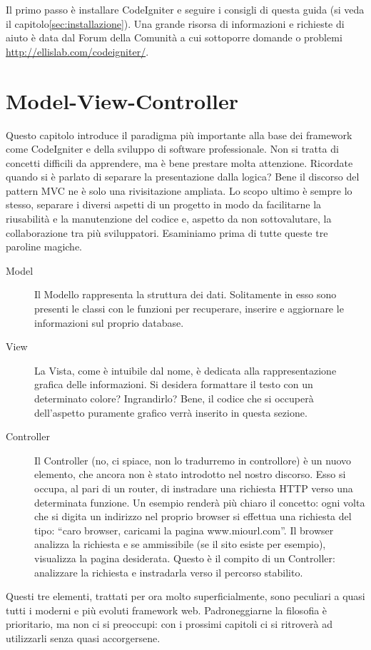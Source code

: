 Il primo passo è installare CodeIgniter e seguire i consigli di questa guida (si veda il capitolo\vref{sec:installazione}). Una grande risorsa di informazioni e richieste di aiuto è data dal Forum della Comunità a cui sottoporre domande o problemi \url{http://ellislab.com/codeigniter/}.

\section{Model-View-Controller}
Questo capitolo introduce il paradigma più importante alla base dei framework come CodeIgniter e della sviluppo di software professionale. Non si tratta di concetti difficili da apprendere, ma è bene prestare molta attenzione. Ricordate quando si è parlato di separare la presentazione dalla logica? Bene il discorso del pattern \ac{MVC} ne è solo una rivisitazione ampliata. Lo scopo ultimo è sempre lo stesso, separare i diversi aspetti di un progetto in modo da facilitarne la riusabilità e la manutenzione del codice e, aspetto da non sottovalutare, la collaborazione tra più sviluppatori. Esaminiamo prima di tutte queste tre paroline magiche.

\begin{description}
\item [Model] Il Modello rappresenta la struttura dei dati. Solitamente in esso sono presenti le classi con le funzioni per recuperare, inserire e aggiornare le informazioni sul proprio database.
\item [View] La Vista, come è intuibile dal nome, è dedicata alla rappresentazione grafica delle informazioni. Si desidera formattare il testo con un determinato colore? Ingrandirlo? Bene, il codice che si occuperà dell'aspetto puramente grafico verrà inserito in questa sezione.
\item [Controller] Il Controller (no, ci spiace, non lo tradurremo in controllore) è un nuovo elemento, che ancora non è stato introdotto nel nostro discorso. Esso si occupa, al pari di un router, di instradare una richiesta \ac{HTTP} verso una determinata funzione. Un esempio renderà più chiaro il concetto: ogni volta che si digita un indirizzo nel proprio browser si effettua una richiesta del tipo: ``caro browser, caricami la pagina www.miourl.com''. Il browser analizza la richiesta e se ammissibile (se il sito esiste per esempio), visualizza la pagina desiderata. Questo è il compito di un Controller: analizzare la richiesta e instradarla verso il percorso stabilito. 
\end{description}

Questi tre elementi, trattati per ora molto superficialmente, sono peculiari a quasi tutti i moderni e più evoluti framework web. Padroneggiarne la filosofia è prioritario, ma non ci si preoccupi: con i prossimi capitoli ci si ritroverà ad utilizzarli senza quasi accorgersene.